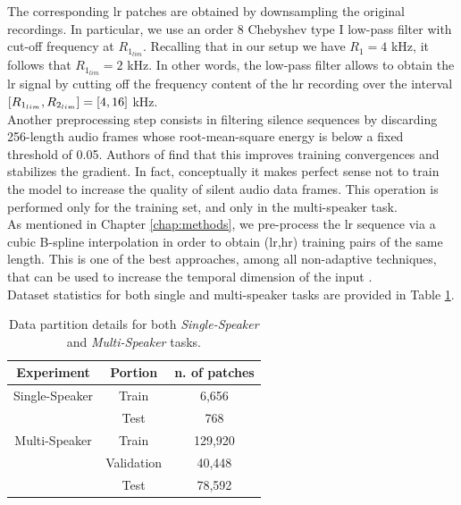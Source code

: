 The corresponding \gls{lr} patches are obtained by downsampling the original recordings. In particular, we use an order 8 Chebyshev type I low-pass filter with cut-off frequency at $R_{1_{lim}}$. Recalling that in our setup we have $R_1 = 4$ kHz, it follows that $R_{1_{lim}} = 2$ kHz. In other words, the low-pass filter allows to obtain the \gls{lr} signal by cutting off the frequency content of the \gls{hr} recording over the interval $\interval{R_{1_{lim}}}{R_{2_{lim}}} = \interval{4}{16}$ kHz. \\
Another preprocessing step consists in filtering silence sequences by discarding 256-length audio frames whose root-mean-square energy is below a fixed threshold of 0.05. Authors of \cite{lim2018time} find that this improves training convergences and stabilizes the gradient. In fact, conceptually it makes perfect sense not to train the model to increase the quality of silent audio data frames. This operation is performed only for the training set, and only in the multi-speaker task. \\
As mentioned in Chapter \ref{chap:methods}, we pre-process the \gls{lr} sequence via a cubic B-spline interpolation in order to obtain (\gls{lr},\gls{hr}) training pairs of the same length. This is one of the best approaches, among all non-adaptive techniques, that can be used to increase the temporal dimension of the input \cite{han2013comparison}. \\
Dataset statistics for both single and multi-speaker tasks are provided in Table \ref{tab:data_partition}. \\
\begin{table}[!htb]
	\begin{center}
		\begin{tabular}{@{}ccc@{}}
			\toprule
			\multicolumn{1}{c}{\textbf{Experiment}} &
			\multicolumn{1}{c}{\textbf{Portion}} &
			\multicolumn{1}{c}{\textbf{n. of patches}} \\ \midrule
			Single-Speaker & Train & 6,656\\
			& Test & 768\\
			Multi-Speaker & Train & 129,920 \\
			& Validation & 40,448 \\
			& Test & 78,592 \\ \bottomrule
		\end{tabular}
		\caption{Data partition details for both \textit{Single-Speaker} and \textit{Multi-Speaker} tasks.}
		\label{tab:data_partition}
	\end{center}
\end{table}

